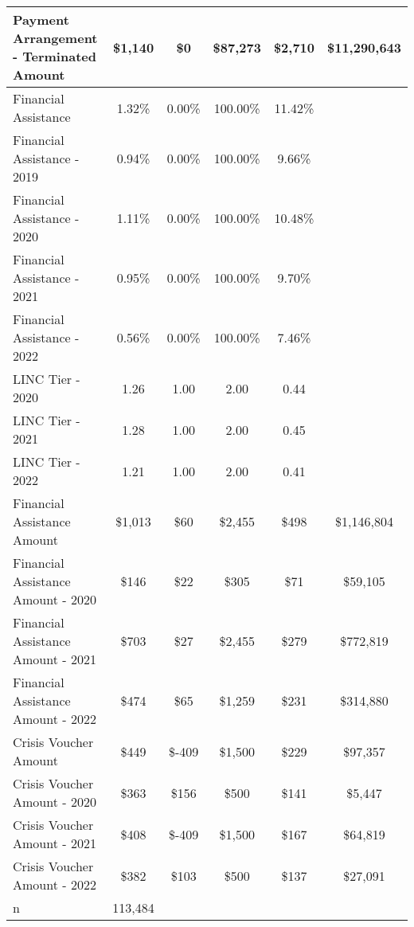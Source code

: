 \begin{tabular}{l|c|c|c|c|c}
\quad Payment Arrangement - Terminated Amount & \$1,140 & \$0 & \$87,273 & \$2,710 & \$11,290,643 \\
\midrule 
Financial Assistance & 1.32\% & 0.00\% & 100.00\% & 11.42\% \\
\quad Financial Assistance - 2019 & 0.94\% & 0.00\% & 100.00\% & 9.66\% \\
\quad Financial Assistance - 2020 & 1.11\% & 0.00\% & 100.00\% & 10.48\% \\
\quad Financial Assistance - 2021 & 0.95\% & 0.00\% & 100.00\% & 9.70\% \\
\quad Financial Assistance - 2022 & 0.56\% & 0.00\% & 100.00\% & 7.46\% \\
\midrule 
LINC Tier - 2020 & 1.26 & 1.00 & 2.00 & 0.44 \\
LINC Tier - 2021 & 1.28 & 1.00 & 2.00 & 0.45 \\
LINC Tier - 2022 & 1.21 & 1.00 & 2.00 & 0.41 \\
\midrule 
Financial Assistance Amount & \$1,013 & \$60 & \$2,455 & \$498 & \$1,146,804 \\
\quad Financial Assistance Amount - 2020 & \$146 & \$22 & \$305 & \$71 & \$59,105 \\
\quad Financial Assistance Amount - 2021 & \$703 & \$27 & \$2,455 & \$279 & \$772,819 \\
\quad Financial Assistance Amount - 2022 & \$474 & \$65 & \$1,259 & \$231 & \$314,880 \\
\midrule 
Crisis Voucher Amount & \$449 & \$-409 & \$1,500 & \$229 & \$97,357 \\
\quad Crisis Voucher Amount - 2020 & \$363 & \$156 & \$500 & \$141 & \$5,447 \\
\quad Crisis Voucher Amount - 2021 & \$408 & \$-409 & \$1,500 & \$167 & \$64,819 \\
\quad Crisis Voucher Amount - 2022 & \$382 & \$103 & \$500 & \$137 & \$27,091 \\
\midrule 
n & 113,484 &  &  &  &  \\
\midrule 
\bottomrule 
\end{tabular}
